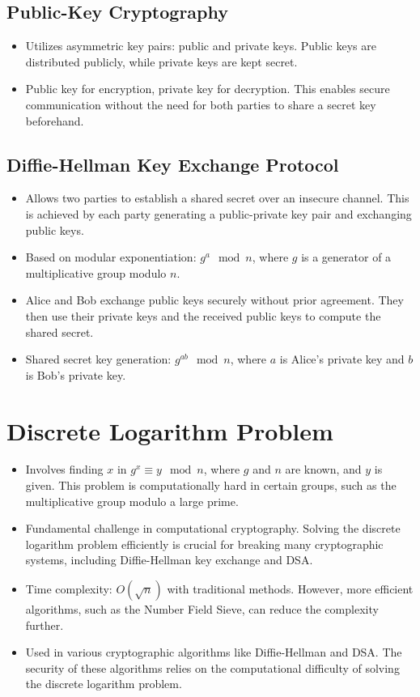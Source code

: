 \documentclass[11pt]{article}
\begin{document}
\subsection{Public-Key Cryptography}
\begin{itemize}
    \item Utilizes asymmetric key pairs: public and private keys. Public keys are distributed publicly, while private keys are kept secret.
    \item Public key for encryption, private key for decryption. This enables secure communication without the need for both parties to share a secret key beforehand.
\end{itemize}

\subsection{Diffie-Hellman Key Exchange Protocol}
\begin{itemize}
    \item Allows two parties to establish a shared secret over an insecure channel. This is achieved by each party generating a public-private key pair and exchanging public keys.
    \item Based on modular exponentiation: $g^a \mod n$, where $g$ is a generator of a multiplicative group modulo $n$.
    \item Alice and Bob exchange public keys securely without prior agreement. They then use their private keys and the received public keys to compute the shared secret.
    \item Shared secret key generation: $g^{ab} \mod n$, where $a$ is Alice's private key and $b$ is Bob's private key.
\end{itemize}

\section{Discrete Logarithm Problem}
\begin{itemize}
    \item Involves finding $x$ in $g^x \equiv y \mod n$, where $g$ and $n$ are known, and $y$ is given. This problem is computationally hard in certain groups, such as the multiplicative group modulo a large prime.
    \item Fundamental challenge in computational cryptography. Solving the discrete logarithm problem efficiently is crucial for breaking many cryptographic systems, including Diffie-Hellman key exchange and DSA.
    \item Time complexity: $O(\sqrt{n})$ with traditional methods. However, more efficient algorithms, such as the Number Field Sieve, can reduce the complexity further.
    \item Used in various cryptographic algorithms like Diffie-Hellman and DSA. The security of these algorithms relies on the computational difficulty of solving the discrete logarithm problem.
\end{itemize}
\end{document}
